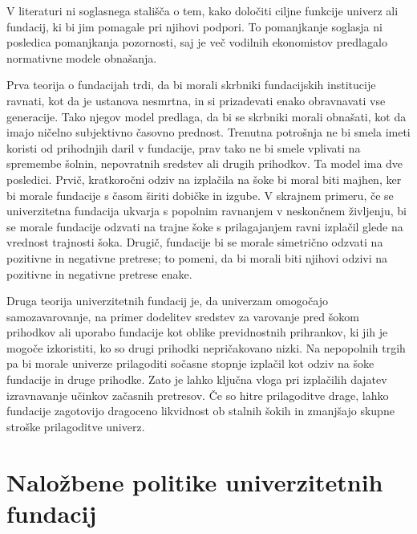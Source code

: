 \documentclass[12pt, a4paper]{article}
\begin{document}
V literaturi ni soglasnega stališča o tem, kako določiti ciljne funkcije univerz ali fundacij, ki bi jim pomagale pri njihovi podpori. To pomanjkanje soglasja ni posledica pomanjkanja pozornosti, saj je več vodilnih ekonomistov predlagalo normativne modele obnašanja. 

Prva teorija o fundacijah trdi, da bi morali skrbniki fundacijskih institucije ravnati, kot da je ustanova nesmrtna, in si prizadevati enako obravnavati vse generacije. Tako njegov model predlaga, da bi se skrbniki morali obnašati, kot da imajo ničelno subjektivno časovno prednost. Trenutna potrošnja ne bi smela imeti koristi od prihodnjih daril v fundacije, prav tako ne bi smele vplivati na spremembe šolnin, nepovratnih sredstev ali drugih prihodkov. Ta model ima dve posledici. Prvič, kratkoročni odziv na izplačila na šoke bi moral biti majhen, ker bi morale fundacije s časom širiti dobičke in izgube. V skrajnem primeru, če se univerzitetna fundacija ukvarja s popolnim ravnanjem v neskončnem življenju, bi se morale fundacije odzvati na trajne šoke s prilagajanjem ravni izplačil glede na vrednost trajnosti šoka. Drugič, fundacije bi se morale simetrično odzvati na pozitivne in negativne pretrese; to pomeni, da bi morali biti njihovi odzivi na pozitivne in negativne pretrese enake.

Druga teorija univerzitetnih fundacij je, da univerzam omogočajo samozavarovanje, na primer dodelitev sredstev za varovanje pred šokom prihodkov ali uporabo fundacije kot oblike previdnostnih prihrankov, ki jih je mogoče izkoristiti, ko so drugi prihodki nepričakovano nizki. Na nepopolnih trgih pa bi morale univerze prilagoditi sočasne stopnje izplačil kot odziv na šoke fundacije in druge prihodke. Zato je lahko ključna vloga pri izplačilih dajatev izravnavanje učinkov začasnih pretresov. Če so hitre prilagoditve drage, lahko fundacije zagotovijo dragoceno likvidnost ob stalnih šokih in zmanjšajo skupne stroške prilagoditve univerz. \cite{soki}

\section[Naložbene politike univerzitetnih fundacij]{Naložbene politike univerzitetnih fundacij}
\end{document}
